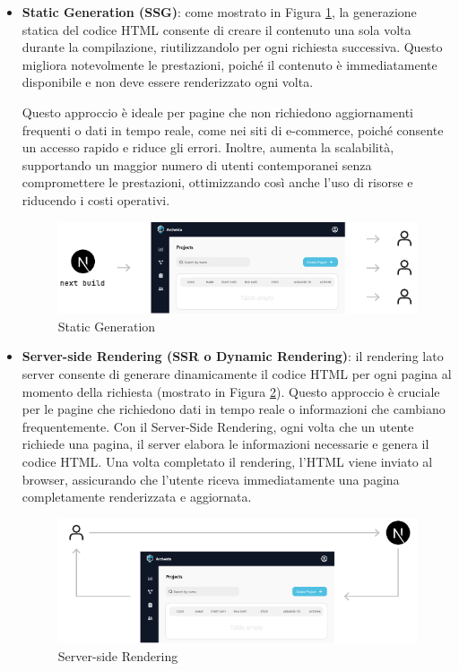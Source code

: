 \documentclass[target=bach,aauheader=,style=]{thud}
\begin{document}
\begin{itemize}
    \item \textbf{Static Generation (SSG)}: come mostrato in Figura \ref{SSG}, la generazione statica del codice HTML consente di creare il contenuto una sola volta durante la compilazione, riutilizzandolo per ogni richiesta successiva. Questo migliora notevolmente le prestazioni, poiché il contenuto è immediatamente disponibile e non deve essere renderizzato ogni volta.
    
    \noindent Questo approccio è ideale per pagine che non richiedono aggiornamenti frequenti o dati in tempo reale, come nei siti di e-commerce, poiché consente un accesso rapido e riduce gli errori. Inoltre, aumenta la scalabilità, supportando un maggior numero di utenti contemporanei senza compromettere le prestazioni, ottimizzando così anche l'uso di risorse e riducendo i costi operativi.
    \begin{figure}[H]
        \centering
        \includegraphics[width=1\textwidth]{img/rendering/static_generation.pdf} 
        \caption{Static Generation}
        \label{SSG}
    \end{figure}
    
    
    \item \textbf{Server-side Rendering (SSR o Dynamic Rendering)}: il rendering lato server consente di generare dinamicamente il codice HTML per ogni pagina al momento della richiesta (mostrato in Figura \ref{SSR}). Questo approccio è cruciale per le pagine che richiedono dati in tempo reale o informazioni che cambiano frequentemente. Con il Server-Side Rendering, ogni volta che un utente richiede una pagina, il server elabora le informazioni necessarie e genera il codice HTML. Una volta completato il rendering, l'HTML viene inviato al browser, assicurando che l'utente riceva immediatamente una pagina completamente renderizzata e aggiornata.
     \begin{figure}[H]
        \centering
        \includegraphics[width=1\textwidth]{img/rendering/server_side_rendering.pdf} 
        \caption{Server-side Rendering}
        \label{SSR}
    \end{figure}
\end{itemize}
\end{document}
